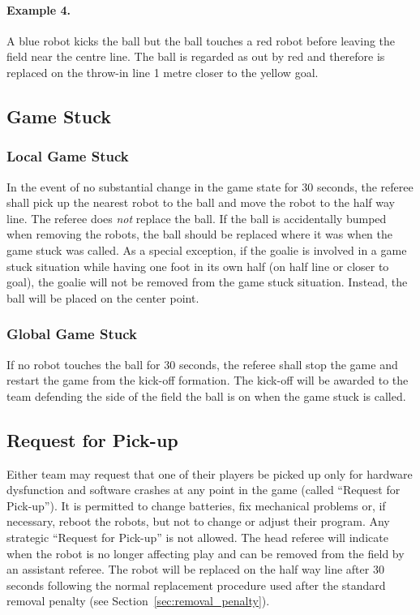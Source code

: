 \documentclass[12pt]{article}
\begin{document}
\paragraph{Example 4.} A blue robot kicks the ball but the ball
touches a red robot before leaving the field near the centre line.
The ball is regarded as out by red and therefore
is replaced on the throw-in line 1 metre closer to the yellow goal.

\subsection{Game Stuck}
\subsubsection{Local Game Stuck}

In the event of no substantial change in the game state for 30
seconds, the referee shall pick up the nearest robot to the ball and move the robot
to the half way line.  The referee does \emph{not} replace the ball.
If the ball is accidentally bumped when removing the robots, the ball should be replaced where
it was when the game stuck was called.  As a special exception, if
the goalie is involved in a game stuck situation while having one foot
in its own half (on half line or closer to goal), the goalie will
not be removed from the game stuck situation. Instead, the ball will be placed on the center point.


\subsubsection{Global Game Stuck}
If no robot touches the ball for 30 seconds, the referee shall stop
the game and restart the game from the kick-off formation. The
kick-off will be awarded to the team defending the side of the field
the ball is on when the game stuck is called.

\subsection{Request for Pick-up}
Either team may request that one of their players be picked up only
for hardware dysfunction and software crashes at any point in the
game (called ``Request for Pick-up''). It is permitted to change
batteries, fix mechanical problems or, if necessary, reboot the
robots, but not to change or adjust their program. Any strategic
``Request for Pick-up'' is not allowed.  The head referee will
indicate when the robot is no longer affecting play and can be
removed from the field by an assistant referee.  The robot will be
replaced on the half way line after 30 seconds following the normal
replacement procedure used after the standard removal penalty (see
Section~\ref{sec:removal_penalty}).
\end{document}
